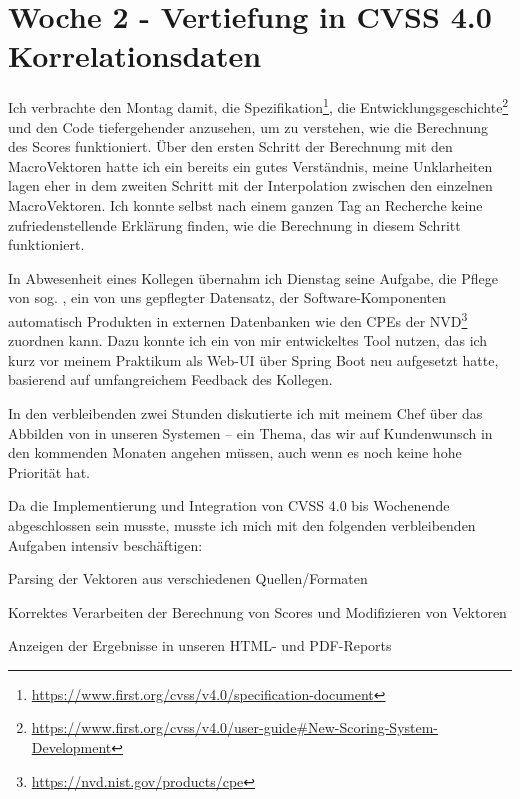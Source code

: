 \section{Woche 2 - Vertiefung in CVSS 4.0 \headerand Korrelationsdaten} \label{sec:bericht-wo-2-initial}


\lweekdaymarginpar{\weekdayMondayLong}

Ich verbrachte den Montag damit, die Spezifikation\footnote{\url{https://www.first.org/cvss/v4.0/specification-document}},
die Entwicklungsgeschichte\footnote{\url{https://www.first.org/cvss/v4.0/user-guide\#New-Scoring-System-Development}}
und den Code tiefergehender anzusehen, um zu verstehen, wie die Berechnung des Scores funktioniert.
Über den ersten Schritt der Berechnung mit den MacroVektoren hatte ich ein bereits ein gutes Verständnis, meine Unklarheiten lagen eher in dem zweiten Schritt mit der Interpolation zwischen den einzelnen MacroVektoren.
Ich konnte selbst nach einem ganzen Tag an Recherche keine zufriedenstellende Erklärung finden, wie die Berechnung in diesem Schritt funktioniert.

\sweekdaymarginpar{\weekdayTuesdayShort, \weekdayWednesdayShort}

In Abwesenheit eines Kollegen übernahm ich Dienstag seine Aufgabe, die Pflege von sog. , ein von uns gepflegter Datensatz, der Software-Komponenten automatisch Produkten in externen Datenbanken wie den CPEs der NVD\footnote{\url{https://nvd.nist.gov/products/cpe}} zuordnen kann.
Dazu konnte ich ein von mir entwickeltes Tool nutzen, das ich kurz vor meinem Praktikum als Web-UI über Spring Boot neu aufgesetzt hatte, basierend auf umfangreichem Feedback des Kollegen.

In den verbleibenden zwei Stunden diskutierte ich mit meinem Chef über das Abbilden von  in unseren Systemen – ein Thema, das wir auf Kundenwunsch in den kommenden Monaten angehen müssen, auch wenn es noch keine hohe Priorität hat.

\sweekdaymarginpar{\weekdayThursdayLong}

Da die Implementierung und Integration von CVSS 4.0 bis Wochenende abgeschlossen sein musste, musste ich mich mit den folgenden verbleibenden Aufgaben intensiv beschäftigen:

\begin{smitemize}
    \item Parsing der Vektoren aus verschiedenen Quellen/Formaten
    \item Korrektes Verarbeiten der Berechnung von Scores und Modifizieren von Vektoren
    \item Anzeigen der Ergebnisse in unseren HTML- und PDF-Reports
\end{smitemize}

